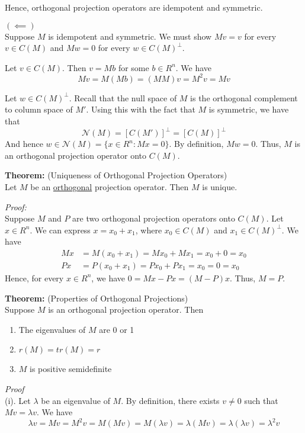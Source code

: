 \documentclass[12pt]{article}
\numberwithin{equation}{section}
\begin{document}
Hence, orthogonal projection operators are idempotent and symmetric.

$(\impliedby)$ \\
Suppose $M$ is idempotent and symmetric. We must show $Mv = v$ for every $v \in C(M)$ and $Mw = 0$ for every $w \in C(M)^{\perp}$.

Let $v \in C(M)$. Then $v = Mb$ for some $b \in R^n$. We have
\begin{equation*}
  Mv = M(Mb) = (MM)v = M^2v = Mv
\end{equation*}

Let $w \in C(M)^{\perp}$. Recall that the null space of $M$ is the orthogonal complement to column space of $M'$. Using this with the fact that $M$ is symmetric, we have that 
\begin{equation*}
  \mathcal{N}(M) = [C(M')]^{\perp} = [C(M)]^{\perp}
\end{equation*}
And hence $w \in \mathcal{N}(M) = \{ x\in R^n : Mx = 0 \}$. By definition, $Mw = 0$. Thus, $M$ is an orthogonal projection operator onto $C(M)$.

\textbf{Theorem:} (Uniqueness of Orthogonal Projection Operators) \\
Let $M$ be an \underline{orthogonal} projection operator. Then $M$ is unique.

\textit{Proof:} \\
Suppose $M$ and $P$ are two orthogonal projection operators onto $C(M)$. Let $x \in R^n$. We can express $x = x_0 + x_1$, where $x_0 \in C(M)$ and $x_1 \in C(M)^{\perp}$. We have
\begin{align*}
  Mx &= M(x_0 + x_1) = Mx_0 + Mx_1 = x_0 + 0 = x_0 \\
  Px &= P(x_0 + x_1) = Px_0 + Px_1 = x_0 = 0 = x_0
\end{align*}
Hence, for every $x \in R^n$, we have $0 = Mx - Px = (M - P)x$. Thus, $M = P$.

\textbf{Theorem:} (Properties of Orthogonal Projections) \\
Suppose $M$ is an orthogonal projection operator. Then
\begin{enumerate} 
  \item The eigenvalues of $M$ are 0 or 1 
  \item $r(M) = tr(M) = r$
  \item $M$ is positive semidefinite
\end{enumerate}

\textit{Proof} \\
(i). Let $\lambda$ be an eigenvalue of $M$. By definition, there exists $v \ne 0$ such that $Mv = \lambda v$. We have
\begin{equation*}
  \lambda v = Mv = M^2 v = M(Mv) = M(\lambda v) = \lambda (Mv) = \lambda (\lambda v) = \lambda^2 v
\end{equation*}
\end{document}

